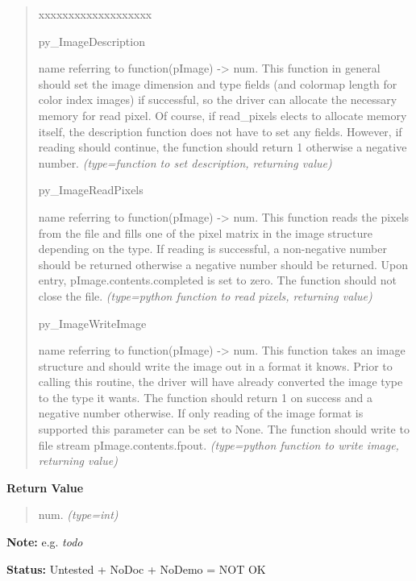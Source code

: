 \begin{boxedminipage}{\funcwidth}
\begin{quote}
\begin{Ventry}{xxxxxxxxxxxxxxxxxxx}
          \item[py\_ImageDescription]


name referring to function(pImage) -> num.
This function in general should set the image dimension and type
fields (and colormap length for color index images) if successful, so
the driver can allocate the necessary memory for read pixel. Of
course, if read\_pixels elects to allocate memory itself, the
description function does not have to set any fields. However, if
reading should continue, the function should return 1 otherwise a
negative number.
            {\it (type=function to set description, returning value)}

          \item[py\_ImageReadPixels]


name referring to function(pImage) -> num.
This function reads the pixels from the file and fills one of the
pixel matrix in the image structure depending on the type. If reading
is successful, a non-negative number should be returned otherwise a
negative number should be returned. Upon entry,
pImage.contents.completed is set to zero. The function should not
close the file.
            {\it (type=python function to read pixels, returning value)}

          \item[py\_ImageWriteImage]


name referring to function(pImage) -> num.
This function takes an image structure and should write the image out
in a format it knows. Prior to calling this routine, the driver will
have already converted the image type to the type it wants. The
function should return 1 on success and a negative number otherwise.
If only reading of the image format is supported this parameter can
be set to None. The function should write to file stream
pImage.contents.fpout.
            {\it (type=python function to write image, returning value)}

        \end{Ventry}

      \end{quote}

      \textbf{Return Value}
    \vspace{-1ex}

      \begin{quote}

num.
      {\it (type=int)}

      \end{quote}

\textbf{Note:} 
e.g. \emph{todo}


\textbf{Status:} 
Untested + NoDoc + NoDemo = NOT OK


    \end{boxedminipage}

